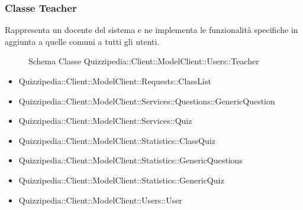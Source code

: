 \subsubsection{Classe Teacher}
Rappresenta un docente del sistema e ne implementa le funzionalità specifiche in aggiunta a quelle comuni a tutti gli utenti.
\begin{figure}[H]
\centering
\noindent{}
\caption{Schema Classe Quizzipedia::Client::ModelClient::Users::Teacher}
\end{figure}
\begin{itemize}
\item Quizzipedia::Client::ModelClient::Requests::ClassList
\item Quizzipedia::Client::ModelClient::Services::Questions::GenericQuestion
\item Quizzipedia::Client::ModelClient::Services::Quiz
\item Quizzipedia::Client::ModelClient::Statistics::ClassQuiz
\item Quizzipedia::Client::ModelClient::Statistics::GenericQuestions
\item Quizzipedia::Client::ModelClient::Statistics::GenericQuiz
\item Quizzipedia::Client::ModelClient::Users::User
\end{itemize}
